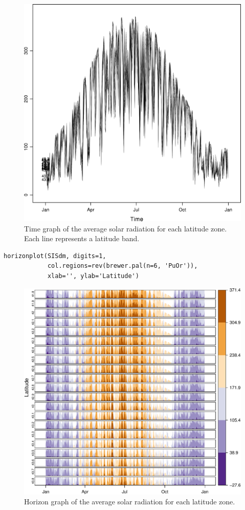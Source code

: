 \documentclass[smallroyalvopaper]{memoir}
\begin{document}
\begin{figure}[htb]
\centering
\includegraphics[width=.9\linewidth]{figs/SISmm_xyplot.png}
\caption{\label{fig:SISmm_xyplot}Time graph of the average solar radiation for each latitude zone. Each line represents a latitude band.}
\end{figure}


\lstset{language=R,numbers=none}
\begin{lstlisting}
horizonplot(SISdm, digits=1,
            col.regions=rev(brewer.pal(n=6, 'PuOr')),
            xlab='', ylab='Latitude')
\end{lstlisting}

\begin{figure}[htb]
\centering
\includegraphics[width=.9\linewidth]{figs/SISdm_horizonplot.pdf}
\caption{\label{fig:SISdm_horizonplot}Horizon graph of the average solar radiation for each latitude zone.}
\end{figure}
\end{document}
